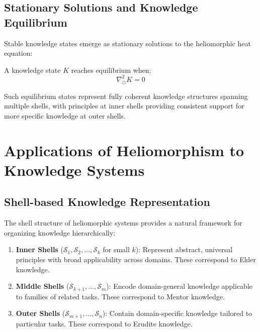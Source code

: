 \subsection{Stationary Solutions and Knowledge Equilibrium}

Stable knowledge states emerge as stationary solutions to the heliomorphic heat equation:

\begin{theorem}
A knowledge state $K$ reaches equilibrium when:
\begin{equation}
\nabla_{\odot}^2 K = 0
\end{equation}
\end{theorem}

Such equilibrium states represent fully coherent knowledge structures spanning multiple shells, with principles at inner shells providing consistent support for more specific knowledge at outer shells.

\section{Applications of Heliomorphism to Knowledge Systems}

\subsection{Shell-based Knowledge Representation}

The shell structure of heliomorphic systems provides a natural framework for organizing knowledge hierarchically:

\begin{enumerate}
    \item \textbf{Inner Shells} ($\mathcal{S}_1, \mathcal{S}_2, \dots, \mathcal{S}_k$ for small $k$): Represent abstract, universal principles with broad applicability across domains. These correspond to Elder knowledge.
    
    \item \textbf{Middle Shells} ($\mathcal{S}_{k+1}, \dots, \mathcal{S}_{m}$): Encode domain-general knowledge applicable to families of related tasks. These correspond to Mentor knowledge.
    
    \item \textbf{Outer Shells} ($\mathcal{S}_{m+1}, \dots, \mathcal{S}_n$): Contain domain-specific knowledge tailored to particular tasks. These correspond to Erudite knowledge.
\end{enumerate}

